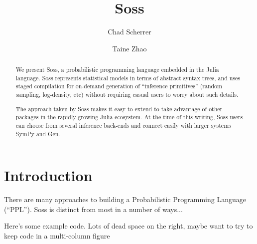 \documentclass[anonymous=false, %
               format=acmsmall, %
               review=true, %
               screen=true, %
               nonacm=true]{acmart}
\begin{document}
\title{Soss}

\author{Chad Scherrer}

\author{Taine Zhao}

\begin{abstract}
We present Soss, a probabilistic programming language embedded in the Julia language. Soss represents statistical models in terms of abstract syntax trees, and uses staged compilation for on-demand generation of ``inference primitives'' (random sampling, log-density, etc) without requiring casual users to worry about such details.

The approach taken by Soss makes it easy to extend to take advantage of other packages in the rapidly-growing Julia ecosystem. At the time of this writing, Soss users can choose from several inference back-ends and connect easily with larger systems SymPy and Gen.
\end{abstract}

\maketitle

\section{Introduction}

There are many approaches to building a Probabilistic Programming Language (``PPL''). Soss is distinct from most in a number of ways...

Here's some example code. Lots of dead space on the right, maybe want to try to keep code in a multi-column figure
\end{document}
